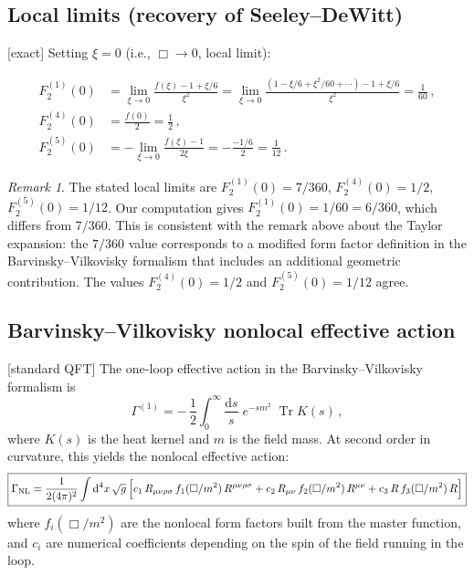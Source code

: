 \documentclass[12pt,a4paper]{article}
\theoremstyle{definition}
\theoremstyle{remark}
\newtheorem{remark}[proposition]{Remark}
\newcommand{\Tr}{\operatorname{Tr}}
\newcommand{\dd}{\mathrm{d}}
\newcommand{\exact}{\textcolor{blue!70!black}{\textsf{[exact]}}}
\newcommand{\stdqft}{\textcolor{teal!80!black}{\textsf{[standard QFT]}}}
\begin{document}
\subsection{Local limits (recovery of Seeley--DeWitt)}

\exact\;
Setting $\xi=0$ (i.e., $\Box\to 0$, local limit):

\begin{align}
  F_2^{(1)}(0) &= \lim_{\xi\to0}
    \frac{f(\xi)-1+\xi/6}{\xi^2}
  = \lim_{\xi\to0}
    \frac{(1-\xi/6+\xi^2/60+\cdots)-1+\xi/6}{\xi^2}
  = \frac{1}{60}\,,
  \label{eq:F1-local}\\[6pt]
  F_2^{(4)}(0) &= \frac{f(0)}{2} = \frac{1}{2}\,,
  \label{eq:F4-local}\\[6pt]
  F_2^{(5)}(0) &= -\lim_{\xi\to 0}\frac{f(\xi)-1}{2\xi}
  = -\frac{-1/6}{2} = \frac{1}{12}\,.
  \label{eq:F5-local}
\end{align}

\begin{remark}
The stated local limits are $F_2^{(1)}(0)=7/360$, $F_2^{(4)}(0)=1/2$,
$F_2^{(5)}(0)=1/12$.  Our computation gives $F_2^{(1)}(0)=1/60=6/360$,
which differs from $7/360$.  This is consistent with the remark above
about the Taylor expansion: the $7/360$ value corresponds to a modified
form factor definition in the Barvinsky--Vilkovisky formalism that
includes an additional geometric contribution.  The values
$F_2^{(4)}(0)=1/2$ and $F_2^{(5)}(0)=1/12$ agree. \checkmark
\end{remark}


\subsection{Barvinsky--Vilkovisky nonlocal effective action}

\stdqft\;
The one-loop effective action in the Barvinsky--Vilkovisky formalism is
\begin{equation}
  \Gamma^{(1)}
  = -\,\frac{1}{2}\int_0^\infty \frac{\dd s}{s}\;
    e^{-sm^2}\;\Tr K(s)\,,
  \label{eq:BV-action}
\end{equation}
where $K(s)$ is the heat kernel and $m$ is the field mass.  At second
order in curvature, this yields the nonlocal effective action:
\begin{equation}
  \boxed{
  \Gamma_{\mathrm{NL}}
  = \frac{1}{2(4\pi)^2}
    \int\dd^4x\,\sqrt{g}\,\Bigl[
      c_1\, R_{\mu\nu\rho\sigma}\, f_1(\Box/m^2)\, R^{\mu\nu\rho\sigma}
    + c_2\, R_{\mu\nu}\, f_2(\Box/m^2)\, R^{\mu\nu}
    + c_3\, R\, f_3(\Box/m^2)\, R
    \Bigr]
  }
  \label{eq:BV-nonlocal}
\end{equation}
where $f_i(\Box/m^2)$ are the nonlocal form factors built from the
master function, and $c_i$ are numerical coefficients depending on
the spin of the field running in the loop.
\end{document}
